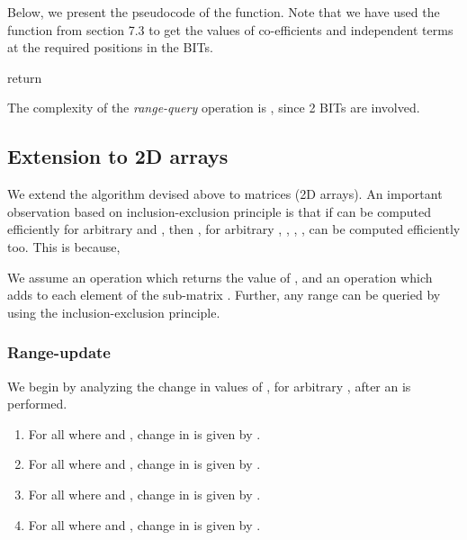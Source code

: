 \documentclass[a4paper]{article}
\begin{document}
\vspace{2 mm}
Below, we present the pseudocode of the  function. Note that we have used the  function from section 7.3 to get the values of co-efficients and independent terms at the required positions in the BITs.

\vspace {3 mm}
\noindent
{}
\begin{algorithmic}[1]

        \State 
        \State 
        \State return 
\EndFunction
\end{algorithmic}

\vspace{3 mm}
The complexity of the \textit{range-query} operation is , since 2 BITs are involved.



\subsection{Extension to 2D arrays}
We extend the algorithm devised above to matrices (2D arrays). An important observation based on inclusion-exclusion principle is that if  can be computed efficiently for arbitrary  and , then , for arbitrary , , , , can be computed efficiently too. This is because,

\vspace{-5 mm}


We assume an operation  which returns the value of , and an operation  which adds  to each element of the sub-matrix . Further, any range can be queried by using the inclusion-exclusion principle.



\subsubsection{Range-update}
We begin by analyzing the change in values of , for arbitrary , after an  is performed.

\begin{enumerate}
\item For all  where  and , change in  is given by .

\item For all  where  and , change in  is given by .

\item For all  where  and , change in  is given by .

\item For all  where  and , change in  is given by .
\end{enumerate}
\end{document}
